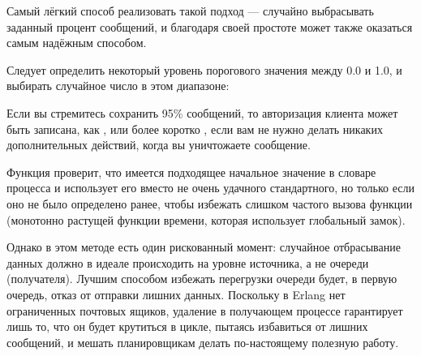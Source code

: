 \documentclass[11pt, oneside]{book}   	%
\begin{document}
Самый лёгкий способ реализовать такой подход --- случайно выбрасывать заданный процент сообщений, и благодаря своей простоте может также оказаться самым надёжным способом.

Следует определить некоторый уровень порогового значения между 0.0 и 1.0, и выбирать случайное число в этом диапазоне:


Если вы стремитесь сохранить 95\% сообщений, то авторизация клиента может быть записана, как , или более коротко , если вам не нужно делать никаких дополнительных действий, когда вы уничтожаете сообщение.

Функция  проверит, что имеется подходящее начальное значение в словаре процесса и использует его вместо не очень удачного стандартного, но только если оно не было определено ранее, чтобы избежать слишком частого вызова функции  (монотонно растущей функции времени, которая использует глобальный замок).

Однако в этом методе есть один рискованный момент: случайное отбрасывание данных должно в идеале происходить на уровне источника, а не очереди (получателя). Лучшим способом избежать перегрузки очереди будет, в первую очередь, отказ от отправки лишних данных. Поскольку в Erlang нет ограниченных почтовых ящиков, удаление в получающем процессе гарантирует лишь то, что он будет крутиться в цикле, пытаясь избавиться от лишних сообщений, и мешать планировщикам делать по-настоящему полезную работу.
\end{document}
